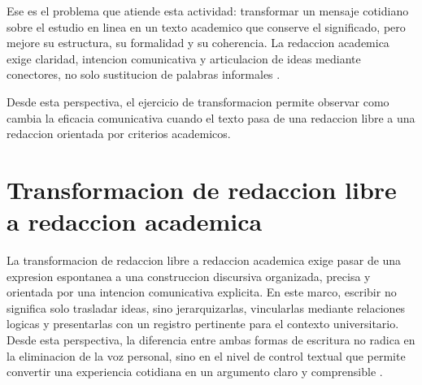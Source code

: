 \documentclass[
	spanish,
	letterpaper, oneside
]{article}
\begin{document}
Ese es el problema que atiende esta actividad: transformar un mensaje cotidiano sobre el estudio en linea en un texto academico que conserve el significado, pero mejore su estructura, su formalidad y su coherencia. La redaccion academica exige claridad, intencion comunicativa y articulacion de ideas mediante conectores, no solo sustitucion de palabras informales \citep{correaManualBasicoEscritura2018,vitoriaEscrituraAcademicaFormacion2019}.

Desde esta perspectiva, el ejercicio de transformacion permite observar como cambia la eficacia comunicativa cuando el texto pasa de una redaccion libre a una redaccion orientada por criterios academicos.

%
%
\section{Transformacion de redaccion libre a redaccion academica}

La transformacion de redaccion libre a redaccion academica exige pasar de una expresion espontanea a una construccion discursiva organizada, precisa y orientada por una intencion comunicativa explicita. En este marco, escribir no significa solo trasladar ideas, sino jerarquizarlas, vincularlas mediante relaciones logicas y presentarlas con un registro pertinente para el contexto universitario. Desde esta perspectiva, la diferencia entre ambas formas de escritura no radica en la eliminacion de la voz personal, sino en el nivel de control textual que permite convertir una experiencia cotidiana en un argumento claro y comprensible \citep{nunezcortesEscrituraAcademicaTeoria2015,correaManualBasicoEscritura2018,vitoriaEscrituraAcademicaFormacion2019}.
\end{document}
